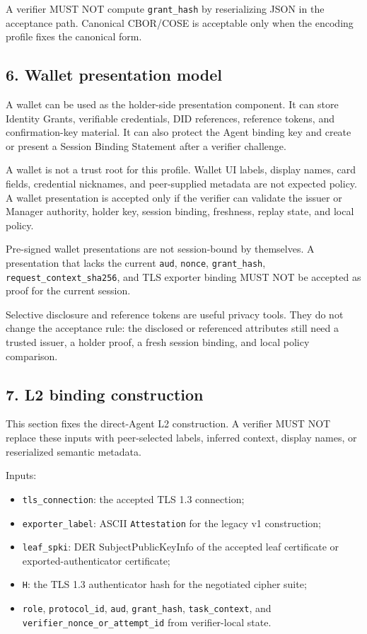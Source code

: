 \documentclass[
]{article}
\providecommand{\tightlist}{%
  \setlength{\itemsep}{0pt}\setlength{\parskip}{0pt}}
\begin{document}
A verifier MUST NOT compute \texttt{grant\_hash} by reserializing JSON
in the acceptance path. Canonical CBOR/COSE is acceptable only when the
encoding profile fixes the canonical form.

\subsection{6. Wallet presentation
model}\label{wallet-presentation-model}

A wallet can be used as the holder-side presentation component. It can
store Identity Grants, verifiable credentials, DID references, reference
tokens, and confirmation-key material. It can also protect the Agent
binding key and create or present a Session Binding Statement after a
verifier challenge.

A wallet is not a trust root for this profile. Wallet UI labels, display
names, card fields, credential nicknames, and peer-supplied metadata are
not expected policy. A wallet presentation is accepted only if the
verifier can validate the issuer or Manager authority, holder key,
session binding, freshness, replay state, and local policy.

Pre-signed wallet presentations are not session-bound by themselves. A
presentation that lacks the current \texttt{aud}, \texttt{nonce},
\texttt{grant\_hash}, \texttt{request\_context\_sha256}, and TLS
exporter binding MUST NOT be accepted as proof for the current session.

Selective disclosure and reference tokens are useful privacy tools. They
do not change the acceptance rule: the disclosed or referenced
attributes still need a trusted issuer, a holder proof, a fresh session
binding, and local policy comparison.

\subsection{7. L2 binding construction}\label{l2-binding-construction}

This section fixes the direct-Agent L2 construction. A verifier MUST NOT
replace these inputs with peer-selected labels, inferred context,
display names, or reserialized semantic metadata.

Inputs:

\begin{itemize}
\tightlist
\item
  \texttt{tls\_connection}: the accepted TLS 1.3 connection;
\item
  \texttt{exporter\_label}: ASCII \texttt{Attestation} for the legacy v1
  construction;
\item
  \texttt{leaf\_spki}: DER SubjectPublicKeyInfo of the accepted leaf
  certificate or exported-authenticator certificate;
\item
  \texttt{H}: the TLS 1.3 authenticator hash for the negotiated cipher
  suite;
\item
  \texttt{role}, \texttt{protocol\_id}, \texttt{aud},
  \texttt{grant\_hash}, \texttt{task\_context}, and
  \texttt{verifier\_nonce\_or\_attempt\_id} from verifier-local state.
\end{itemize}
\end{document}

